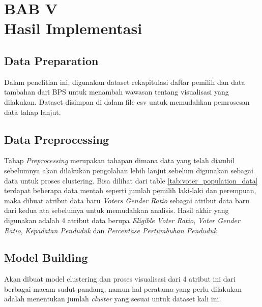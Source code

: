 \section*{\centering BAB V \\ Hasil Implementasi }


\setcounter{section}{5}
\setcounter{subsection}{0}  %
\setcounter{figure}{0}
\setcounter{table}{0}
\setcounter{lstlisting}{0}
\renewcommand{\thetable}{\thesection.\arabic{table}}
\renewcommand{\thefigure}{\thesection.\arabic{figure}}
\renewcommand{\thelstlisting}{\thesection.\arabic{lstlisting}}

\subsection{Data Preparation}
Dalam penelitian ini, digunakan dataset rekapitulasi daftar pemilih dan data tambahan dari BPS untuk menambah wawasan tentang visualisasi yang dilakukan. Dataset disimpan di dalam file csv untuk memudahkan pemrosesan data tahap lanjut.

\subsection{Data Preprocessing}
Tahap \textit{Preprocessing} merupakan tahapan dimana data yang telah diambil sebelumnya akan dilakukan pengolahan lebih lanjut sebelum digunakan sebagai data untuk proses clustering. Bisa dilihat dari table \ref{tab:voter_population_data} terdapat beberapa data mentah seperti jumlah pemilih laki-laki dan perempuan, maka dibuat atribut data baru \textit{Voters Gender Ratio} sebagai atribut data baru dari kedua ata sebelumya untuk memudahkan analisis. Hasil akhir yang digunakan adalah 4 atribut data berupa \textit{Eligible Voter Ratio}, \textit{Voter Gender Ratio}, \textit{Kepadatan Penduduk} dan \textit{Percentase Pertumbuhan Penduduk}

\subsection{Model Building}
Akan dibuat model clustering dan proses visualisasi dari 4 atribut ini dari berbagai macam sudut pandang, namun hal peratama yang perlu dilakukan adalah menentukan jumlah \textit{cluster} yang sesuai untuk dataset kali ini.

